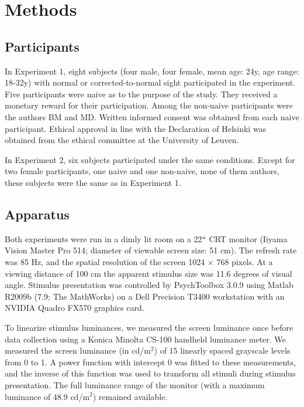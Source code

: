 \documentclass[12pt]{article}
\begin{document}
\section{Methods}\label{section_methods}

\subsection{Participants}\label{subsection_methods_participants}
In Experiment 1, eight subjects (four male, four female, mean age: 24y, age range: 18-32y) with normal or corrected-to-normal sight participated in the experiment. Five participants were naive as to the purpose of the study. They received a monetary reward for their participation. Among the non-naive participants were the authors BM and MD. Written informed consent was obtained from each naive participant. Ethical approval in line with the Declaration of Helsinki was obtained from the ethical committee at the University of Leuven.

In Experiment 2, six subjects participated under the same conditions. Except for two female participants, one naive and one non-naive, none of them authors, these subjects were the same as in Experiment 1.


\subsection{Apparatus}\label{subsection_methods_apparatus}

Both experiments were run in a dimly lit room on a 22\verb+"+ CRT monitor (Iiyama Vision Master Pro 514; diameter of viewable screen size: 51 cm). The refresh rate was 85 Hz, and the spatial resolution of the screen 1024 $\times$ 768 pixels. At a viewing distance of 100 cm the apparent stimulus size was 11.6 degrees of visual angle. Stimulus presentation was controlled by PsychToolbox 3.0.9 \cite{Brainard97} using Matlab R2009b (7.9; The MathWorks) on a Dell Precision T3400 workstation with an NVIDIA Quadro FX570 graphics card.

To linearize stimulus luminances, we measured the screen luminance once before data collection using a Konica Minolta CS-100 handheld luminance meter. We measured the screen luminance (in cd/m$^2$) of 15 linearly spaced grayscale levels from 0 to 1. A power function with intercept 0 was fitted to these measurements, and the inverse of this function was used to transform all stimuli during stimulus presentation. The full luminance range of the monitor (with a maximum luminance of 48.9 cd/m$^2$) remained available.
\end{document}
